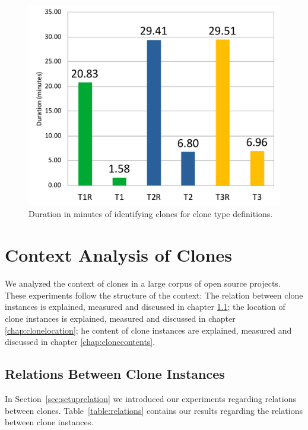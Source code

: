 \begin{figure}[H]
  \centering
    \includegraphics[width=.5\columnwidth]{img/DurationChart}
    \caption{Duration in minutes of identifying clones for clone type definitions.}
  \label{fig:performance}
\end{figure}

\section{Context Analysis of Clones}\label{chap:clonecontextexpl}
We analyzed the context of clones in a large corpus of open source projects. These experiments follow the structure of the context: The relation between clone instances is explained, measured and discussed in chapter \ref{chap:relationsinstances}; the location of clone instances is explained, measured and discussed in chapter \ref{chap:clonelocation};  he content of clone instances are explained, measured and discussed in chapter \ref{chap:clonecontents}.

\subsection{Relations Between Clone Instances} \label{chap:relationsinstances}
In Section~\ref{sec:setuprelation} we introduced our experiments regarding relations between clones. Table~\ref{table:relations} contains our results regarding the relations between clone instances.


